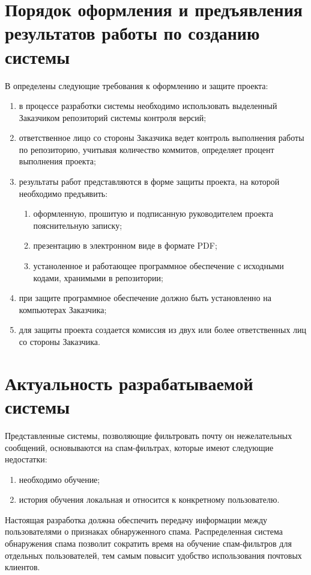 \section{Порядок оформления и предъявления результатов работы по созданию системы}
В \cite{metodKKrishenko} определены следующие требования к оформлению и защите проекта:

\begin{enumerate}
	\item в процессе разработки системы необходимо использовать выделенный Заказчиком репозиторий системы контроля версий;
	\item ответственное лицо со стороны Заказчика ведет контроль выполнения работы по репозиторию, учитывая количество коммитов, определяет процент выполнения проекта;
	\item результаты работ представляются в форме защиты проекта, на которой необходимо предъявить:
		\begin{enumerate}
			\item оформленную, прошитую и подписанную руководителем проекта пояснительную записку;
			\item презентацию в электронном виде в формате PDF;
			\item устаноленное и работающее программное обеспечение с исходными кодами, хранимыми в репозитории;
		\end{enumerate}
	\item при защите программное обеспечение должно быть установленно на компьютерах Заказчика;
	\item для защиты проекта создается комиссия из двух или более ответственных лиц со стороны Заказчика.
\end{enumerate}


\section{Актуальность разрабатываемой системы}
Представленные системы, позволяющие фильтровать почту он нежелательных сообщений, основываются на спам-фильтрах, которые имеют следующие недостатки:

\begin{enumerate}
\item{необходимо обучение;}
\item{история обучения локальная и относится к конкретному пользователю.}
\end{enumerate}

Настоящая разработка должна обеспечить передачу информации между пользователями о признаках обнаруженного спама. Распределенная система обнаружения спама позволит сократить время на обучение спам-фильтров для отдельных пользователей, тем самым повысит удобство использования почтовых клиентов.



